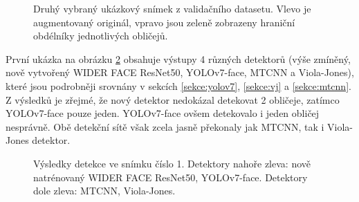 \begin{figure}[H] 
  \begin{center}
  \label{obrazek:test2gt}
  \caption{Druhý vybraný ukázkový snímek z validačního datasetu. Vlevo je augmentovaný originál, vpravo jsou zeleně zobrazeny hraniční obdélníky jednotlivých obličejů.}
  \end{center}
\end{figure}

První ukázka na obrázku \ref{obrazek:test1} obsahuje výstupy 4 různých detektorů (výše zmíněný, nově vytvořený WIDER FACE ResNet50, YOLOv7-face, MTCNN a Viola-Jones), které jsou podrobněji srovnány v sekcích \ref{sekce:yolov7}, \ref{sekce:vj} a \ref{sekce:mtcnn}. Z výsledků je zřejmé, že nový detektor nedokázal detekovat 2 obličeje, zatímco YOLOv7-face pouze jeden. YOLOv7-face ovšem detekovalo i jeden obličej nesprávně. Obě detekční sítě však zcela jasně překonaly jak MTCNN, tak i Viola-Jones detektor.

\begin{figure}[H] 
  \begin{center}
  \label{obrazek:test1}
  \caption{Výsledky detekce ve snímku číslo 1. Detektory nahoře zleva: nově natrénovaný WIDER FACE ResNet50, YOLOv7-face. Detektory dole zleva: MTCNN, Viola-Jones.}
  \end{center}
\end{figure}

